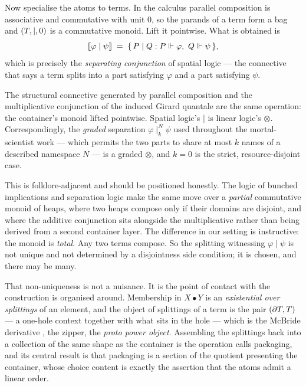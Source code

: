 Now specialise the atoms to terms. In the \rhoc{} calculus parallel composition is
associative and commutative with unit $0$, so the parands of a term form a bag and
$(T,\mid,0)$ is a commutative monoid. Lift it pointwise. What is obtained is
\[
  \llbracket \varphi \mid \psi \rrbracket \;=\; \{\, P \mid Q : P \Vdash \varphi,\ Q \Vdash \psi \,\},
\]
which is precisely the \emph{separating conjunction} of spatial logic
\cite{CairesCardelli03,MeredithRadestock05b} --- the connective that says a term
splits into a part satisfying $\varphi$ and a part satisfying $\psi$.

\begin{observation}
\label{obs:sepisotimes}
The structural connective generated by parallel composition and the multiplicative
conjunction of the induced Girard quantale are the same operation: the container's
monoid lifted pointwise. Spatial logic's $\mid$ is linear logic's $\otimes$.
Correspondingly, the \emph{graded} separation $\varphi \mid_{k}^{N} \psi$ used
throughout the mortal-scientist work --- which permits the two parts to share at
most $k$ names of a described namespace $N$ --- is a graded $\otimes$, and $k=0$
is the strict, resource-disjoint case.
\end{observation}

This is folklore-adjacent and should be positioned honestly. The logic of bunched
implications \cite{OHearnPym99} and separation logic \cite{Reynolds02} make the
same move over a \emph{partial} commutative monoid of heaps, where two heaps
compose only if their domains are disjoint, and where the additive conjunction
sits alongside the multiplicative rather than being derived from a second
container layer. The difference in our setting is instructive: the \rhoc{}
monoid is \emph{total}. Any two terms compose. So the splitting witnessing
$\varphi \mid \psi$ is not unique and not determined by a disjointness side
condition; it is chosen, and there may be many.

That non-uniqueness is not a nuisance. It is the point of contact with the
construction \cite{Zeus} is organised around. Membership in $X \bullet Y$ is an
\emph{existential over splittings} of an element, and the object of splittings of
a term is the pair $(\partial T, T)$ --- a one-hole context together with what sits in
the hole --- which is the McBride derivative \cite{McBride01,Huet97}, the zipper,
the \emph{proto power object}. Assembling the splittings back into a collection of
the same shape as the container is the operation \cite{Zeus} calls packaging, and
its central result is that packaging is a section of the quotient presenting the
container, whose choice content is exactly the assertion that the atoms admit a
linear order.

